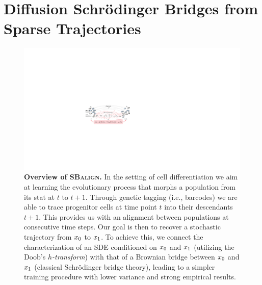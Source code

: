 \newpage
\section{Diffusion Schr\"odinger Bridges from Sparse Trajectories}
\label{sec:sbalign}

\begin{figure}[H]
    \centering
    \includegraphics[width=.8\linewidth]{figures/fig_overview_sbalign.pdf}
    \caption{\textbf{Overview of \textsc{SBalign}.} In the setting of cell differentiation we aim at learning the evolutionary process that morphs a population from its stat at $t$ to $t+1$. Through genetic tagging (i.e., barcodes) we are able to trace progenitor cells at time point $t$ into their descendants $t+1$. This provides us with an alignment between populations at consecutive time steps. Our goal is then to recover a stochastic trajectory from $x_0$ to $x_1$. To achieve this, we connect the characterization of an SDE conditioned on $x_0$ and $x_1$ (utilizing the Doob's \emph{$h$-transform}) with that of a Brownian bridge between $x_0$ and $x_1$ (classical Schr{\"o}dinger bridge theory), leading to a simpler training procedure with lower variance and strong empirical results.}
    \label{fig:overview_sbalign}
\end{figure}

